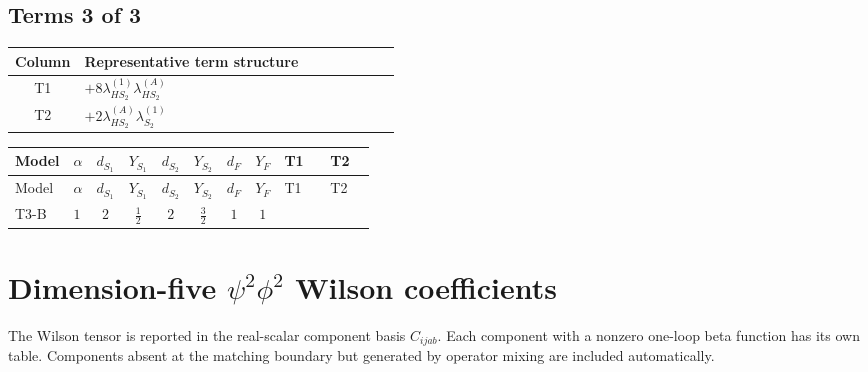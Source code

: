 \documentclass[8pt]{article}
\begin{document}
\begin{landscape}
\subsection*{Terms 3 of 3}
\begin{center}
\begin{tabular}{@{}c >{\raggedright\arraybackslash}p{0.82\linewidth}@{}}
\toprule
Column & Representative term structure \\
\midrule
T1 & \(\displaystyle +8 {\lambda_{HS_2}^{(1)}} {\lambda_{HS_2}^{(A)}}\) \\
\midrule
T2 & \(\displaystyle +2 {\lambda_{HS_2}^{(A)}} {\lambda_{S_2}^{(1)}}\) \\
\midrule
\bottomrule
\end{tabular}
\end{center}
\smallskip
\tiny
\begin{longtable}{@{}llcccccc >{\raggedright\arraybackslash}p{0.21\linewidth} >{\raggedright\arraybackslash}p{0.21\linewidth}@{}}
\toprule
Model & $\alpha$ & $d_{S_1}$ & $Y_{S_1}$ & $d_{S_2}$ & $Y_{S_2}$ & $d_F$ & $Y_F$ & T1 & T2 \\
\midrule
\endfirsthead
\toprule
Model & $\alpha$ & $d_{S_1}$ & $Y_{S_1}$ & $d_{S_2}$ & $Y_{S_2}$ & $d_F$ & $Y_F$ & T1 & T2 \\
\midrule
\endhead
T3-B & $1$ & $2$ & $\frac{1}{2}$ & $2$ & $\frac{3}{2}$ & $1$ & $1$ & \scriptsize\adjustbox{max width=\linewidth}{$\begin{gathered} +8 {\lambda_{HS_2}^{(1)}} {\lambda_{HS_2}^{(A)}}\end{gathered}$} & \scriptsize\adjustbox{max width=\linewidth}{$\begin{gathered} +2 {\lambda_{HS_2}^{(A)}} {\lambda_{S_2}^{(1)}}\end{gathered}$} \\
\midrule
\bottomrule
\end{longtable}
\clearpage
\section*{Dimension-five $\psi^2\phi^2$ Wilson coefficients}
The Wilson tensor is reported in the real-scalar component basis $C_{ijab}$. Each component with a nonzero one-loop beta function has its own table. Components absent at the matching boundary but generated by operator mixing are included automatically.

\end{landscape}
\end{document}
